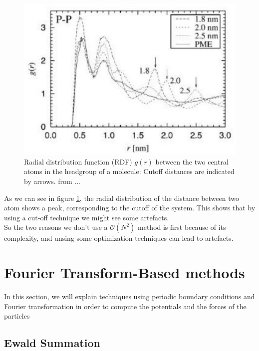 \documentclass[12pt,twoside,a4paper]{report}
\begin{document}
\begin{figure}[H]

\includegraphics[scale=0.8]{artefact}
 \centering
 
\caption{Radial distribution function (RDF) $g(r)$ between the two
central atoms in the headgroup of a molecule: Cutoff distances are indicated by arrows. from ...}

\label{fig:artefact}

\end{figure}


As we can see in figure \ref{fig:artefact},  the radial distribution of the distance between two atom shows a peak, corresponding to the cutoff of the system. This shows that by using a cut-off technique we might see some artefacts.\\

So the two reasons we don't use a $\mathcal{O}(N^2)$ method is first because of its complexity, and unsing some optimization techniques can lead to artefacts.

\section{Fourier Transform-Based methods}

In this section, we will explain techniques using periodic boundary conditions and Fourier transformation in order to compute the potentials and the forces of the particles

\subsection{Ewald Summation}
\end{document}
